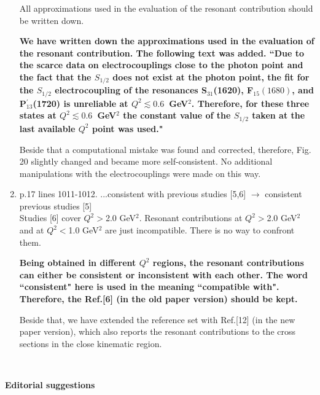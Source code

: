 \documentclass[,superscriptaddress,showpacs,amssymb,amsmath,amsfonts,linenumbers,article]{revtex4-1}
\begin{document}
\begin{enumerate}
All approximations used in the evaluation of the resonant contribution should be written down.\\[0.5cm]

{\bf We have written down the approximations used in the evaluation of the resonant contribution. The following text was added. ``Due to the scarce data on electrocouplings close to the photon point  and the fact that the $S_{1/2}$ does not exist at the photon point, the fit for the $S_{1/2}$ electrocoupling of the resonances S$_{31}$(1620), F$_{15}(1680)$, and P$^{'}_{13}$(1720) is unreliable at $Q^{2} \lesssim 0.6$~GeV$^{2}$. Therefore, for these three states at $Q^{2} \lesssim 0.6$~GeV$^{2}$ the constant value of the $S_{1/2}$ taken at the last available $Q^{2}$ point was used." 

Beside that a computational mistake was found and corrected, therefore, Fig. 20 slightly changed and became more self-consistent. No additional manipulations with the electrocouplings were made on this way.}



\item p.17 lines 1011-1012. ...consistent with previous studies [5,6] $\rightarrow$ consistent previous studies [5]\\

Studies [6] cover $Q^2>$2.0 GeV$^2$. Resonant contributions at $Q^2>$2.0 GeV$^2$ and at $Q^2<$1.0 GeV$^2$ are just incompatible. There is no way to confront them.\\[0.5cm]

{\bf Being obtained in different $Q^{2}$ regions, the resonant contributions can either be consistent or inconsistent with each other. The word ``consistent" here is used in the meaning ``compatible with". Therefore, the Ref.[6] (in the old paper version) should be kept.


Beside that, we have extended the reference set with Ref.[12] (in the new paper version), which also reports the resonant contributions to the cross sections in the close kinematic region.}\\[0.5cm]



\end{enumerate}


 {\bf \large Editorial suggestions}\\[1cm]
 
\end{document}
